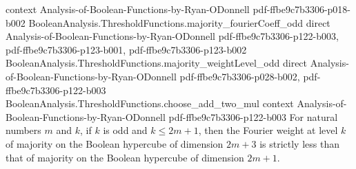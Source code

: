 \begin{theorem}
  {context}
  {Analysis-of-Boolean-Functions-by-Ryan-ODonnell}
  {pdf-ffbe9c7b3306-p018-b002}
\proofstep
  {BooleanAnalysis.ThresholdFunctions.majority_fourierCoeff_odd}
  {direct}
  {Analysis-of-Boolean-Functions-by-Ryan-ODonnell}
  {pdf-ffbe9c7b3306-p122-b003,
    pdf-ffbe9c7b3306-p123-b001,
    pdf-ffbe9c7b3306-p123-b002}
\proofstep
  {BooleanAnalysis.ThresholdFunctions.majority_weightLevel_odd}
  {direct}
  {Analysis-of-Boolean-Functions-by-Ryan-ODonnell}
  {pdf-ffbe9c7b3306-p028-b002,
    pdf-ffbe9c7b3306-p122-b003}
\proofstep
  {BooleanAnalysis.ThresholdFunctions.choose_add_two_mul}
  {context}
  {Analysis-of-Boolean-Functions-by-Ryan-ODonnell}
  {pdf-ffbe9c7b3306-p122-b003}
For natural numbers $m$ and $k$, if $k$ is odd and $k\le 2m+1$, then the Fourier weight
at level $k$ of majority on the Boolean hypercube of dimension $2m+3$ is strictly less
than that of majority on the Boolean hypercube of dimension $2m+1$.
\end{theorem}

